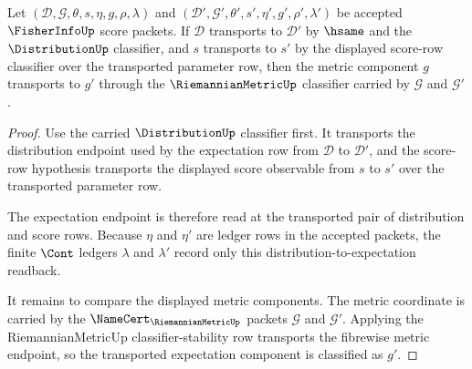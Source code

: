 \begin{theorem}
\label{thm:fisherinfo-riemannian-metric-row-transport}
Let $(\mathcal{D},\mathcal{G},\theta,s,\eta,g,\rho,\lambda)$ and
$(\mathcal{D}',\mathcal{G}',\theta',s',\eta',g',\rho',\lambda')$ be accepted
$\FisherInfoUp$ score packets. If $\mathcal{D}$ transports to
$\mathcal{D}'$ by $\hsame$ and the $\DistributionUp$ classifier, and $s$
transports to $s'$ by the displayed score-row classifier over the transported
parameter row, then the metric component $g$ transports to $g'$ through the
$\RiemannianMetricUp$ classifier carried by $\mathcal{G}$ and
$\mathcal{G}'$.
\end{theorem}
\begin{proof}
Use the carried $\DistributionUp$ classifier first. It transports the
distribution endpoint used by the expectation row from $\mathcal{D}$ to
$\mathcal{D}'$, and the score-row hypothesis transports the displayed score
observable from $s$ to $s'$ over the transported parameter row.

The expectation endpoint is therefore read at the transported pair of
distribution and score rows. Because $\eta$ and $\eta'$ are ledger rows in the
accepted packets, the finite $\Cont$ ledgers $\lambda$ and $\lambda'$ record
only this distribution-to-expectation readback.

It remains to compare the displayed metric components. The metric coordinate
is carried by the $\NameCert_{\RiemannianMetricUp}$ packets $\mathcal{G}$ and
$\mathcal{G}'$. Applying the RiemannianMetricUp classifier-stability row
transports the fibrewise metric endpoint, so the transported expectation
component is classified as $g'$.
\end{proof}

